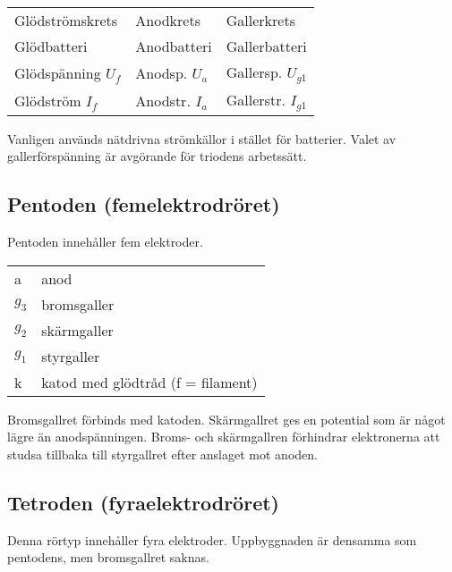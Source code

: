 \begin{center}
\begin{tabular}{lll}
Glödströmskrets      & Anodkrets        &  Gallerkrets \\
Glödbatteri          & Anodbatteri      &  Gallerbatteri \\
Glödspänning \(U_f\) & Anodsp. \(U_a\)  &  Gallersp. \(U_{g1}\) \\
Glödström \(I_f\)    & Anodstr. \(I_a\) &  Gallerstr. \(I_{g1}\) \\
\end{tabular}
\end{center}

\noindent
Vanligen används nätdrivna strömkällor i stället för batterier.
Valet av gallerförspänning är avgörande för triodens arbetssätt.

\subsection{Pentoden (femelektrodröret)}

Pentoden innehåller fem elektroder.

\begin{center}
\begin{tabular}{ll}
  a       & anod \\
  \(g_3\) & bromsgaller \\
  \(g_2\) & skärmgaller \\
  \(g_1\) & styrgaller \\
  k      & katod med glödtråd (f = filament) \\
\end{tabular}
\end{center}

Bromsgallret förbinds med katoden. Skärmgallret ges en potential som är något
lägre än anodspänningen.
Broms- och skärmgallren förhindrar elektronerna att studsa tillbaka till
styrgallret efter anslaget mot anoden.


\subsection{Tetroden (fyraelektrodröret)}

Denna rörtyp innehåller fyra elektroder. Uppbyggnaden är densamma som pentodens,
men bromsgallret saknas.


